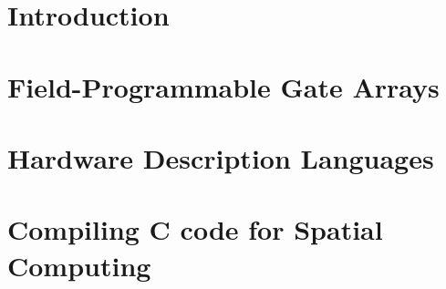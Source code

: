 \section{Introduction}
\label{reconfigurableComputing:introduction}


\section{Field-Programmable Gate Arrays}
\label{fpga}


\section{Hardware Description Languages}
\label{hdl}


\section{Compiling C code for Spatial Computing}
\label{cForSpatial}

